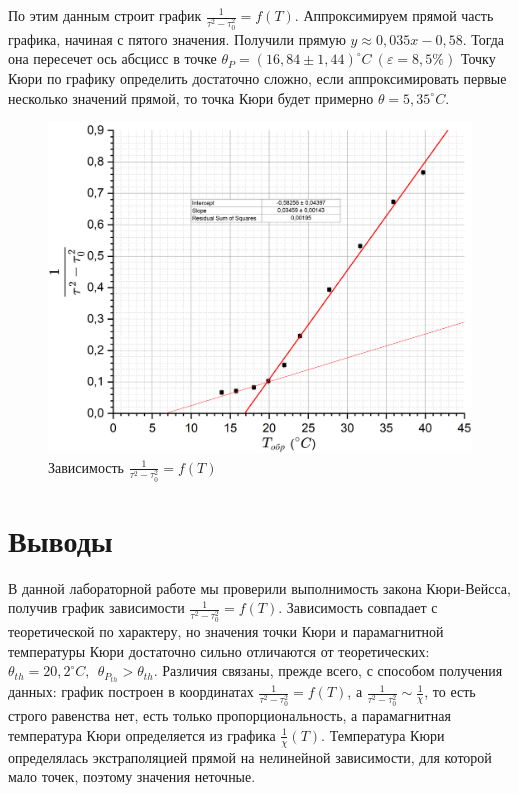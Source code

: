 \documentclass[a4paper, 12pt]{article}
\begin{document}
	По этим данным строит график $\frac{1}{\tau^2 - \tau_0^2} = f(T)$. Аппроксимируем прямой часть графика, начиная с пятого значения. Получили прямую $y \approx 0,035x - 0,58$. Тогда она пересечет ось абсцисс в точке $\theta_P = (16,84 \pm 1,44) ^{\circ}C \ (\varepsilon = 8,5\%)$
	Точку Кюри по графику определить достаточно сложно, если аппроксимировать первые несколько значений прямой, то точка Кюри будет примерно $\theta = 5,35^{\circ}C$.
	\begin{figure}[h!]
		\centering
		\includegraphics[width = \textwidth]{Veys}
		\caption{Зависимость $\frac{1}{\tau^2 - \tau_0^2} = f(T)$}
	\end{figure}
	\section*{Выводы} 
	В данной лабораторной работе мы проверили выполнимость закона Кюри-Вейсса, получив график зависимости $\frac{1}{\tau^2 - \tau_0^2} = f(T)$. Зависимость совпадает с теоретической по характеру, но значения точки Кюри и парамагнитной температуры Кюри достаточно сильно отличаются от теоретических: $\theta_{th} = 20,2^{\circ}C, \ \ \theta_{P_{th}} > \theta_{th}$. Различия связаны, прежде всего, с способом получения данных: график построен в координатах $\frac{1}{\tau^2 - \tau_0^2} = f(T)$, а $\frac{1}{\tau^2 - \tau_0^2} \sim \frac{1}{\chi}$, то есть строго равенства нет, есть только пропорциональность, а парамагнитная температура Кюри определяется из графика $\frac{1}{\chi}(T)$. Температура Кюри определялась экстраполяцией прямой на нелинейной зависимости, для которой мало точек, поэтому значения неточные.
\end{document}
